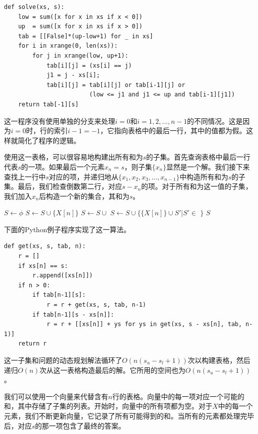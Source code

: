 \documentclass[b5paper]{ctexart}
\begin{document}
\lstset{language=Python}
\begin{lstlisting}
def solve(xs, s):
    low = sum([x for x in xs if x < 0])
    up  = sum([x for x in xs if x > 0])
    tab = [[False]*(up-low+1) for _ in xs]
    for i in xrange(0, len(xs)):
        for j in xrange(low, up+1):
            tab[i][j] = (xs[i] == j)
            j1 = j - xs[i];
            tab[i][j] = tab[i][j] or tab[i-1][j] or
                        (low <= j1 and j1 <= up and tab[i-1][j1])
    return tab[-1][s]
\end{lstlisting}

这一程序没有使用单独的分支来处理$i = 0$和$i = 1, 2, ..., n-1$的不同情况。这是因为$i = 0$时，行的索引$i - 1 = -1$，它指向表格中的最后一行，其中的值都为假。这样就简化了程序的逻辑。

使用这一表格，可以很容易地构建出所有和为$s$的子集。首先查询表格中最后一行代表$s$的一项。如果最后一个元素$x_n = s$，则子集$\{x_n\}$显然是一个解。我们接下来查找上一行中$s$对应的项，并递归地从$\{x_1, x_2, x_3, ..., x_{n-1}\}$中构造所有和为$s$的子集。最后，我们检查倒数第二行，对应$s - x_n$的项。对于所有和为这一值的子集，我们加入$x_n$后构造一个新的集合，其和为$s$。

\begin{algorithmic}[1]
  \State $S \gets \phi$
    \State $S \gets S \cup \{X[n]\}$
  \EndIf
      \State $S \gets S \cup $ 
    \EndIf
      \State $S \gets S \cup \{\{X[n]\} \cup S' | S' \in $  $\}$
    \EndIf
  \EndIf
  \State \Return $S$
\EndFunction
\end{algorithmic}

下面的Python例子程序实现了这一算法。

\lstset{language=Python}
\begin{lstlisting}
def get(xs, s, tab, n):
    r = []
    if xs[n] == s:
        r.append([xs[n]])
    if n > 0:
        if tab[n-1][s]:
            r = r + get(xs, s, tab, n-1)
        if tab[n-1][s - xs[n]]:
            r = r + [[xs[n]] + ys for ys in get(xs, s - xs[n], tab, n-1)]
    return r
\end{lstlisting}

这一子集和问题的动态规划解法循环了$O(n(s_u - s_l + 1))$次以构建表格，然后递归$O(n)$次从这一表格构造最后的解。它所用的空间也为$O(n(s_u - s_l + 1))$。

我们可以使用一个向量来代替含有$n$行的表格。向量中的每一项对应一个可能的和，其中存储了子集的列表。开始时，向量中的所有项都为空。对于$X$中的每一个元素，我们不断更新向量，它记录了所有可能得到的和。当所有的元素都处理完毕后，对应$s$的那一项包含了最终的答案。
\end{document}
